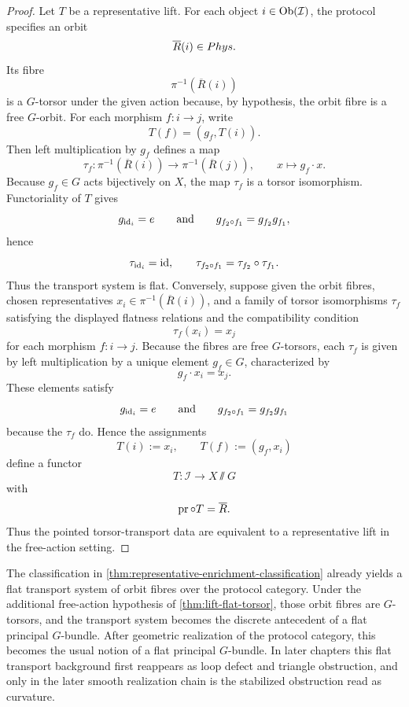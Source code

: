 \begin{proof}
	Let \(T\) be a representative lift.
	For each object \(i\in\operatorname{Ob}(\mathcal I)\), the protocol specifies an
	orbit
	\[
		\overline R(i)\in Phys.
	\]
	Its fibre
	\[
		\pi^{-1}(\overline R(i))
	\]
	is a \(G\)-torsor under the given action because, by hypothesis, the
	orbit fibre is a free \(G\)-orbit.
	For each morphism \(f:i\to j\), write
	\[
		T(f)=(g_f,T(i)).
	\]
	Then left multiplication by \(g_f\) defines a map
	\[
		\tau_f:\pi^{-1}(\overline R(i))\to \pi^{-1}(\overline R(j)),
		\qquad
		x\mapsto g_f\cdot x.
	\]
	Because \(g_f\in G\) acts bijectively on \(X\), the map \(\tau_f\) is a
	torsor isomorphism.
	Functoriality of \(T\) gives
	\[
		g_{\operatorname{id}_i}=e
		\qquad\text{and}\qquad
		g_{f_2\circ f_1}=g_{f_2}g_{f_1},
	\]
	hence
	\[
		\tau_{\operatorname{id}_i}=\operatorname{id},
		\qquad
		\tau_{f_2\circ f_1}=\tau_{f_2}\circ\tau_{f_1}.
	\]
	Thus the transport system is flat.
	Conversely, suppose given the orbit fibres, chosen representatives
	\(x_i\in\pi^{-1}(\overline R(i))\), and a family of torsor
	isomorphisms \(\tau_f\) satisfying the displayed flatness relations
	and the compatibility condition
	\[
		\tau_f(x_i)=x_j
	\]
	for each morphism \(f:i\to j\).
	Because the fibres are free \(G\)-torsors, each \(\tau_f\) is given by
	left multiplication by a unique element \(g_f\in G\), characterized by
	\[
		g_f\cdot x_i=x_j.
	\]
	These elements satisfy
	\[
		g_{\operatorname{id}_i}=e
		\qquad\text{and}\qquad
		g_{f_2\circ f_1}=g_{f_2}g_{f_1}
	\]
	because the \(\tau_f\) do.
	Hence the assignments
	\[
		T(i):=x_i,
		\qquad
		T(f):=(g_f,x_i)
	\]
	define a functor
	\[
		T:\mathcal I\to X\sslash G
	\]
	with
	\[
		\operatorname{pr}\circ T=\overline R.
	\]
	Thus the pointed torsor-transport data are equivalent to a
	representative lift in the free-action setting.
\end{proof}
\begin{remark}
	The classification in
	\cref{thm:representative-enrichment-classification} already yields a
	flat transport system of orbit fibres over the protocol category.
	Under the additional free-action hypothesis of
	\cref{thm:lift-flat-torsor}, those orbit fibres are \(G\)-torsors,
	and the transport system becomes the discrete antecedent of a flat
	principal \(G\)-bundle. After geometric realization of the protocol
	category, this becomes the usual notion of a flat principal
	\(G\)-bundle. In later chapters this flat transport background first
	reappears as loop defect and triangle obstruction, and only in the
	later smooth realization chain is the stabilized obstruction read as
	curvature.
\end{remark}
